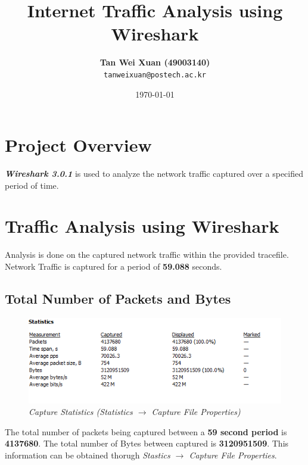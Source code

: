 \documentclass[a4paper,11pt]{article}
\begin{document}
\title{\vspace{-1.0cm}\textbf{Internet Traffic Analysis using Wireshark}}
\author{
  \textbf{Tan Wei Xuan (49003140)}\\
  \texttt{tanweixuan@postech.ac.kr}
}
\date{\today}
\maketitle

\section{Project Overview}
\textit{\textbf{Wireshark 3.0.1}} is used to analyze the network traffic captured over a specified period of time.

\section{Traffic Analysis using Wireshark}
Analysis is done on the captured network traffic within the provided tracefile. Network Traffic is captured for a period of \textbf{59.088} seconds.

\subsection{Total Number of Packets and Bytes}
\begin{figure}[h!]
	\includegraphics{TtlNoPacketsBytes}
	\caption{\textit{Capture Statistics (Statistics $\rightarrow$ Capture File Properties)}}
\end{figure}
The total number of packets being captured between a \textbf{59 second period} is \textbf{4137680}. The total number of Bytes between captured is \textbf{3120951509}. This information can be obtained thorugh \textit{Stastics $\rightarrow$ Capture File Properties}.
\end{document}
